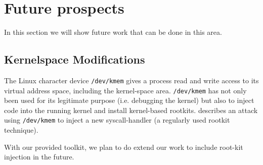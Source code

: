 %
%

\section{Future prospects}

\label{prospects}

In this section we will show future work that can be done in this area.

\subsection{Kernelspace Modifications}

The Linux character device \texttt{/dev/kmem} gives a process read and write
access to its virtual address space, including the kernel-space area.
\texttt{/dev/kmem} has not only been used for its legitimate purpose (i.e.
debugging the kernel) but also to inject code into the running kernel and
install kernel-based rootkits. \cite{phrack58.7:2001} describes an attack using
\texttt{/dev/kmem} to inject a new syscall-handler (a regularly used rootkit
technique).

With our provided toolkit, we plan to do extend our work to include root-kit
injection in the future.

%
%

